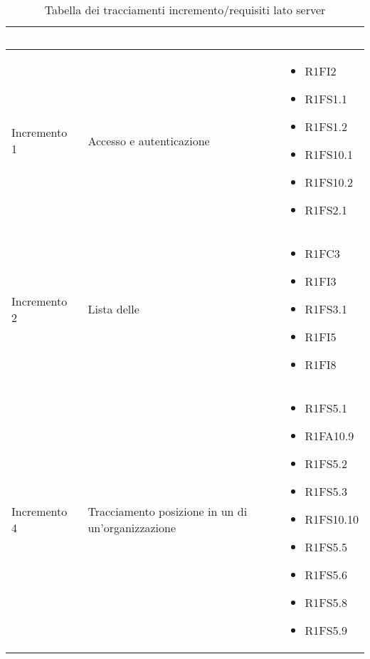 {
\renewcommand{\arraystretch}{2}
\centering
	
\begin{longtable}{C{4cm} C{6cm} C{4cm}}
\caption{Tabella dei tracciamenti incremento/requisiti lato server}\\

\textcolor{white}{\textbf{Incremento}} &
\textcolor{white}{\textbf{Descrizione}} & 
\textcolor{white}{\textbf{Requisiti}}\\	
\endhead

Incremento 1 & Accesso e autenticazione & \begin{itemize}
    \item[ ] R1FI2
    \item[ ] R1FS1.1
    \item[ ] R1FS1.2 
    \item[ ] R1FS10.1
    \item[ ] R1FS10.2
    \item[ ] R1FS2.1
\end{itemize}\\

Incremento 2 & Lista delle  & \begin{itemize}
    \item[ ] R1FC3
    \item[ ] R1FI3
    \item[ ] R1FS3.1
    \item[ ] R1FI5
    \item[ ] R1FI8
\end{itemize}\\

Incremento 4 & Tracciamento posizione in un  di un'organizzazione & \begin{itemize}
    \item[ ] R1FS5.1
    \item[ ] R1FA10.9
    \item[ ] R1FS5.2
    \item[ ] R1FS5.3
    \item[ ] R1FS10.10
    \item[ ] R1FS5.5
    \item[ ] R1FS5.6
    \item[ ] R1FS5.8
    \item[ ] R1FS5.9
\end{itemize}\\

\end{longtable}
}
